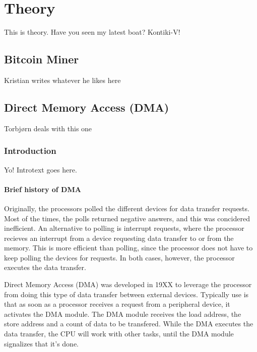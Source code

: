 \chapter{Theory}
This is theory.
Have you seen my latest boat?
Kontiki-V!

\section{Bitcoin Miner}

Kristian writes whatever he likes here

\section{Direct Memory Access (DMA)}

Torbjørn deals with this one

\subsection{Introduction}

Yo!
Introtext goes here.

\subsubsection{Brief history of DMA}

Originally, the processors polled the different devices for data transfer requests. Most of the times, the polls returned negative answers, and this was concidered inefficient. An alternative to polling is interrupt requests, where the processor recieves an interrupt from a device requesting data transfer to or from the memory. This is more efficient than polling, since the processor does not have to keep polling the devices for requests. In both cases, however, the processor executes the data transfer.

Direct Memory Access (DMA) was developed in 19XX to leverage the processor from doing this type of data transfer between external devices. Typically use is that as soon as a processor receives a request from a peripheral device, it activates the DMA module. The DMA module receives the load address, the store address and a count of data to be transfered. While the DMA executes the data transfer, the CPU will work with other tasks, until the DMA module signalizes that it's done.

